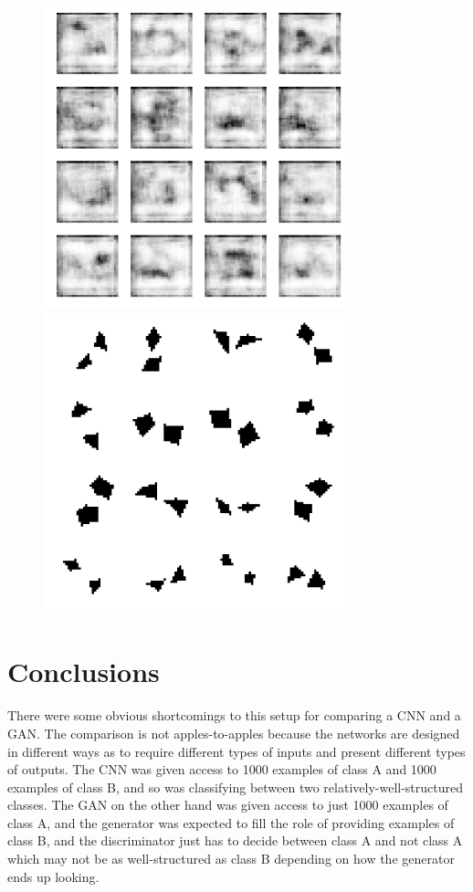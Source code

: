 \documentclass{article}
\begin{document}
\clearpage
\begin{figure}[ht]
\label{fig:gan-samples-matching}
\centering
\includegraphics[height=330px]{gan-sample-fake-matching.png}
\caption{}
\includegraphics[height=330px]{gan-sample-real-matching.png}
\end{figure}

\restoregeometry

\newpage
\section{Conclusions}

There were some obvious shortcomings to this setup for comparing a CNN and a GAN.
The comparison is not apples-to-apples because the networks are designed in different ways as to require different types of inputs and present different types of outputs.
The CNN was given access to 1000 examples of class A and 1000 examples of class B, and so was classifying between two relatively-well-structured classes.
The GAN on the other hand was given access to just 1000 examples of class A, and the generator was expected to fill the role of providing examples of class B, and the discriminator just has to decide between class A and not class A which may not be as well-structured as class B depending on how the generator ends up looking.
\end{document}
